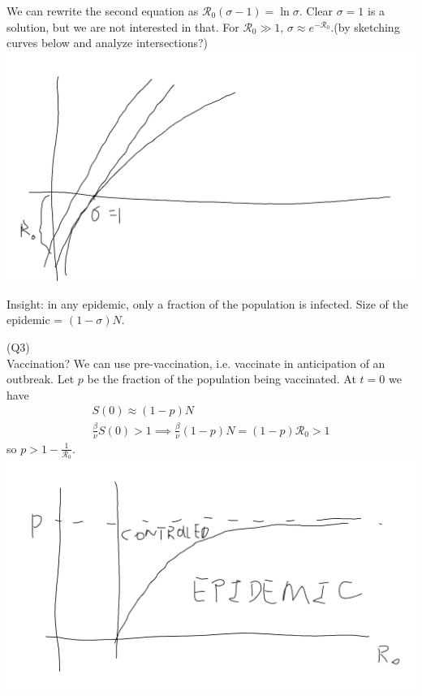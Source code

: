 \documentclass[a4paper]{article}
\begin{document}
We can rewrite the second equation as $\mathcal{R}_0 (\sigma-1) = \ln \sigma$. Clear $\sigma = 1$ is a solution, but we are not interested in that. For $\mathcal{R}_0 \gg 1$, $\sigma \approx e^{-\mathcal{R}_0}$.(by sketching curves below and analyze intersections?)
\includegraphics[scale=0.5]{image/Bio_08.png}

Insight: in any epidemic, only a fraction of the population is infected. Size of the epidemic = $(1-\sigma)N$.

(Q3)\\
Vaccination? We can use pre-vaccination, i.e. vaccinate in anticipation of an outbreak. Let $p$ be the fraction of the population being vaccinated. At $t=0$ we have
\begin{equation*}
\begin{aligned}
S(0) \approx (1-p)N\\
\frac{\beta}{\nu} S(0) > 1 \implies \frac{\beta}{\nu} (1-p)N = (1-p)\mathcal{R_0} > 1
\end{aligned}
\end{equation*}
so $p>1-\frac{1}{\mathcal{R}_0}$.
\includegraphics[scale=0.5]{image/Bio_09.png}
\end{document}
